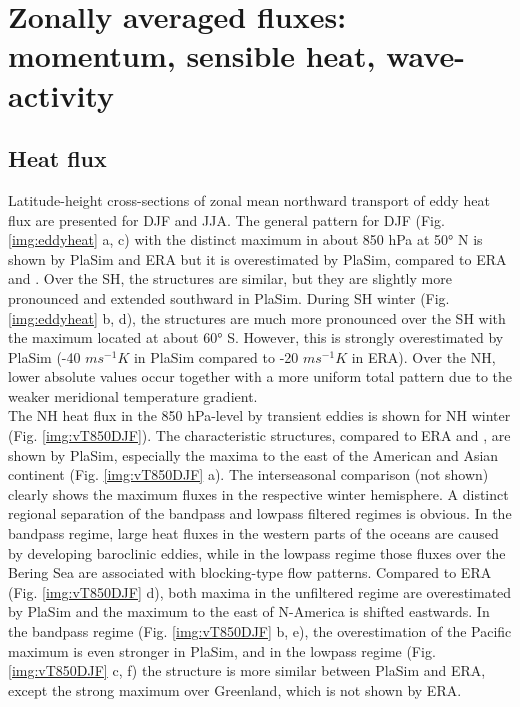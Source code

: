 \documentclass[12pt,a4paper,twoside,openright,headinclude,liststotoc,bibtotoc]{scrreprt}
\begin{document}
\vspace{-0.4cm}
\chapter{Zonally averaged fluxes: momentum, sensible heat, wave-activity}


\vspace{-0.4cm}
\section{Heat flux}
\vspace{-0.4cm}


Latitude-height cross-sections of zonal mean northward transport of eddy heat flux are presented for DJF and JJA. The general pattern for DJF (Fig. \ref{img:eddyheat} a, c) with the distinct maximum in about 850 hPa at 50° N is shown by PlaSim and ERA but it is overestimated by PlaSim, compared to ERA and \citet[p. 326]{Peixoto1993}. Over the SH, the structures are similar, but they are slightly more pronounced and extended southward in PlaSim. During SH winter (Fig. \ref{img:eddyheat} b, d), the structures are much more pronounced over the SH with the maximum located at about 60° S. However, this is strongly overestimated by PlaSim (-40 $ms^{-1}K$ in PlaSim compared to -20 $ms^{-1}K$ in ERA). Over the NH, lower absolute values occur together with a more uniform total pattern due to the weaker meridional temperature gradient.\\
The NH heat flux in the 850 hPa-level by transient eddies is shown for NH winter (Fig. \ref{img:vT850DJF}). The characteristic structures, compared to ERA and \citet[p. 86]{Roeckner1996}, are shown by PlaSim, especially the maxima to the east of the American and Asian continent (Fig. \ref{img:vT850DJF} a). The interseasonal comparison (not shown) clearly shows the maximum fluxes in the respective winter hemisphere. A distinct regional separation of the bandpass and lowpass filtered regimes is obvious. In the bandpass regime, large heat fluxes in the western parts of the oceans are caused by developing baroclinic eddies, while in the lowpass regime those fluxes over the Bering Sea are associated with blocking-type flow patterns. Compared to ERA (Fig. \ref{img:vT850DJF} d), both maxima in the unfiltered regime are overestimated by PlaSim and the maximum to the east of N-America is shifted eastwards. In the bandpass regime (Fig. \ref{img:vT850DJF} b, e), the overestimation of the Pacific maximum is even stronger in PlaSim, and in the lowpass regime (Fig. \ref{img:vT850DJF} c, f) the structure is more similar between PlaSim and ERA, except the strong maximum over Greenland, which is not shown by ERA.
\end{document}
